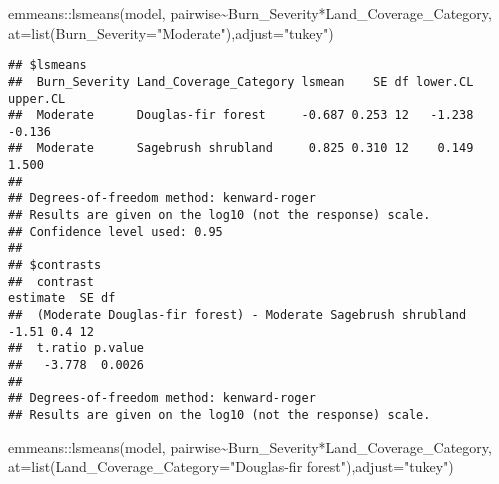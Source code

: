 \documentclass[
]{article}
\newenvironment{Shaded}{\begin{snugshade}}{\end{snugshade}}
\newcommand{\AttributeTok}[1]{\textcolor[rgb]{0.77,0.63,0.00}{#1}}
\newcommand{\FunctionTok}[1]{\textcolor[rgb]{0.00,0.00,0.00}{#1}}
\newcommand{\NormalTok}[1]{#1}
\newcommand{\SpecialCharTok}[1]{\textcolor[rgb]{0.00,0.00,0.00}{#1}}
\newcommand{\StringTok}[1]{\textcolor[rgb]{0.31,0.60,0.02}{#1}}
\begin{document}
\begin{Shaded}
\begin{Highlighting}[]
\NormalTok{emmeans}\SpecialCharTok{::}\FunctionTok{lsmeans}\NormalTok{(model, pairwise}\SpecialCharTok{\textasciitilde{}}\NormalTok{Burn\_Severity}\SpecialCharTok{*}\NormalTok{Land\_Coverage\_Category, }\AttributeTok{at=}\FunctionTok{list}\NormalTok{(}\AttributeTok{Burn\_Severity=}\StringTok{"Moderate"}\NormalTok{),}\AttributeTok{adjust=}\StringTok{"tukey"}\NormalTok{) }
\end{Highlighting}
\end{Shaded}

\begin{verbatim}
## $lsmeans
##  Burn_Severity Land_Coverage_Category lsmean    SE df lower.CL upper.CL
##  Moderate      Douglas-fir forest     -0.687 0.253 12   -1.238   -0.136
##  Moderate      Sagebrush shrubland     0.825 0.310 12    0.149    1.500
## 
## Degrees-of-freedom method: kenward-roger 
## Results are given on the log10 (not the response) scale. 
## Confidence level used: 0.95 
## 
## $contrasts
##  contrast                                                     estimate  SE df
##  (Moderate Douglas-fir forest) - Moderate Sagebrush shrubland    -1.51 0.4 12
##  t.ratio p.value
##   -3.778  0.0026
## 
## Degrees-of-freedom method: kenward-roger 
## Results are given on the log10 (not the response) scale.
\end{verbatim}

\begin{Shaded}
\begin{Highlighting}[]
\NormalTok{emmeans}\SpecialCharTok{::}\FunctionTok{lsmeans}\NormalTok{(model, pairwise}\SpecialCharTok{\textasciitilde{}}\NormalTok{Burn\_Severity}\SpecialCharTok{*}\NormalTok{Land\_Coverage\_Category, }\AttributeTok{at=}\FunctionTok{list}\NormalTok{(}\AttributeTok{Land\_Coverage\_Category=}\StringTok{"Douglas{-}fir forest"}\NormalTok{),}\AttributeTok{adjust=}\StringTok{"tukey"}\NormalTok{) }
\end{Highlighting}
\end{Shaded}
\end{document}
